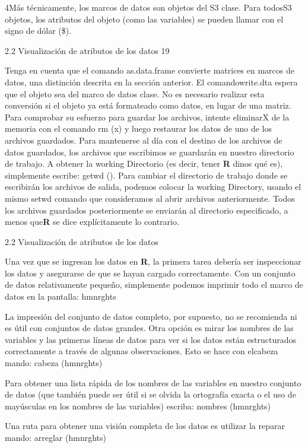 \documentclass[
]{book}
\begin{document}
4Más técnicamente, los marcos de datos son objetos del S3 clase. Para todosS3 objetos, los atributos del objeto (como las variables) se pueden llamar con el signo de dólar (\$).

2.2 Visualización de atributos de los datos 19

Tenga en cuenta que el comando as.data.frame convierte matrices en marcos de datos, una distinción descrita en la sección anterior. El comandowrite.dta espera que el objeto sea del marco de datos clase. No es necesario realizar esta conversión si el objeto ya está formateado como datos, en lugar de una matriz. Para comprobar su esfuerzo para guardar los archivos, intente eliminarX de la memoria con el comando rm (x) y luego restaurar los datos de uno de los archivos guardados.
Para mantenerse al día con el destino de los archivos de datos guardados, los archivos que escribimos se guardarán en nuestro directorio de trabajo. A obtener la working Directorio (es decir, tener \textbf{R}
dinos qué es), simplemente escribe: getwd (). Para cambiar el directorio de trabajo donde se
escribirán los archivos de salida, podemos colocar la working Directory, usando el mismo setwd comando que consideramos al abrir archivos anteriormente. Todos los archivos guardados posteriormente se enviarán al directorio especificado, a menos que\textbf{R} se dice explícitamente lo contrario.

2.2 Visualización de atributos de los datos

Una vez que se ingresan los datos en \textbf{R}, la primera tarea debería ser inspeccionar los datos y asegurarse de que se hayan cargado correctamente. Con un conjunto de datos relativamente pequeño, simplemente podemos imprimir todo el marco de datos en la pantalla:
hmnrghts

La impresión del conjunto de datos completo, por supuesto, no se recomienda ni es útil con conjuntos de datos grandes. Otra opción es mirar los nombres de las variables y las primeras líneas de datos para ver si los datos están estructurados correctamente a través de algunas observaciones. Esto se hace con elcabeza mando:
cabeza (hmnrghts)

Para obtener una lista rápida de los nombres de las variables en nuestro conjunto de datos (que también puede ser útil si se olvida la ortografía exacta o el uso de mayúsculas en los nombres de las variables) escriba:
nombres (hmnrghts)

Una ruta para obtener una visión completa de los datos es utilizar la reparar mando:
arreglar (hmnrghts)
\end{document}
